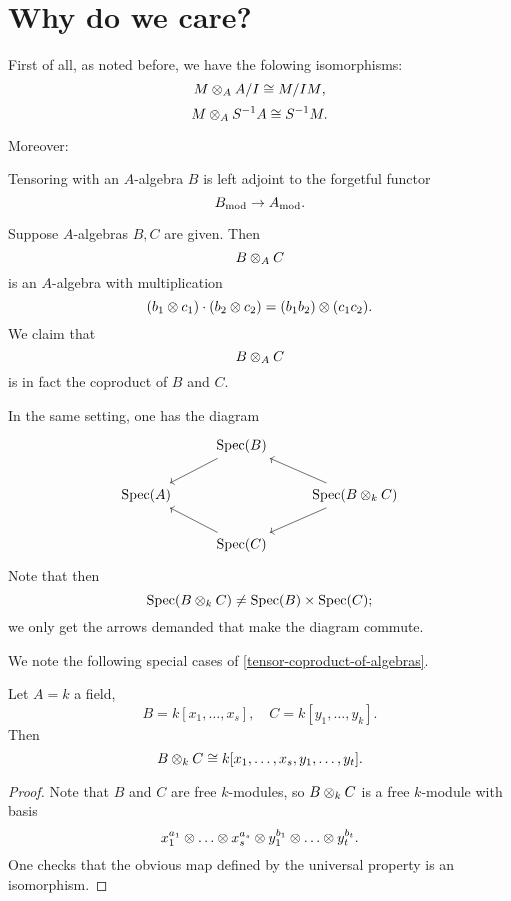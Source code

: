 \section{Why do we care?}


First of all, as noted before, we have the folowing isomorphisms:
\[ M \otimes_A A /{I} \cong M /{IM},\]
\[ M \otimes_A S^{-1}A \cong S^{-1} M.\]

Moreover:
\begin{prop}
Tensoring with an $A$-algebra $B$ is left adjoint to the forgetful functor
\[ B_\text{mod} \to A_\text{mod}.\]
\end{prop}

\begin{prop}
  \label{tensor-coproduct-of-algebras}
Suppose $A$-algebras $B, C$ are given. Then
\[ B \otimes_A C\]
is an $A$-algebra with multiplication
\[ (b_1 \otimes c_1) \cdot (b_2 \otimes c_2) = (b_1 b_2) \otimes (c_1 c_2).\]
We claim that
\[ B \otimes_A C\]
is in fact the coproduct of $B$ and $C$.
\end{prop}

\begin{note}
In the same setting, one has the diagram
\begin{equation*}
  \begin{tikzcd}
    & \spec(B) \arrow{dl} & \\
    \spec(A)
    & & \spec(B \tensor_k C) \arrow{ul} \arrow{dl} \\
    & \spec(C) \arrow{ul} &
  \end{tikzcd}
\end{equation*}
Note that then
\[ \text{Spec}(B \otimes_k C) \neq \text{Spec}(B) \times \text{Spec}(C);\]
we only get the arrows demanded that make the diagram commute.
\end{note}

We note the following special cases of \cref{tensor-coproduct-of-algebras}.

\begin{corollary}
  Let $A = k$ a field,
  \[ B = k[x_1, \dotsc, x_s], \quad C = k[y_1, \dotsc, y_k].\]
  Then
  \[ B \otimes_k C \cong k[x_1, \dotsc, x_s, y_1, \dotsc, y_t].\]
\end{corollary}
\begin{proof}
  Note that $B$ and $C$ are free $k$-modules, so $B \otimes_k C$ is a free $k$-module with basis
  \[x_1^{a_1} \otimes \dotso \otimes x_s^{a_s} \otimes y_1^{b_1} \otimes \dotso \otimes y_t^{b_t}.\]
  One checks that the obvious map defined by the universal property is an isomorphism.
\end{proof}


